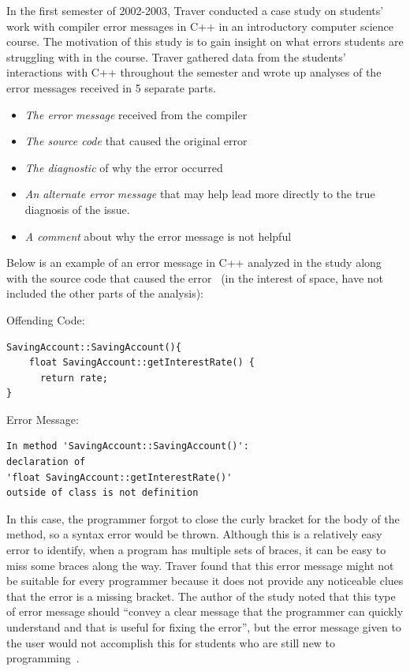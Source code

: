 \documentclass{sig-alternate}
\begin{document}
In the first semester of 2002-2003, Traver conducted a case study on students' work with compiler error messages in C++ in an introductory computer science course.
The motivation of this study is to gain insight on what errors students are struggling with in the course.
Traver gathered data from the students' interactions with C++ throughout the semester and wrote up analyses of the error messages received in 5 separate parts.
\begin{itemize}
	\item \textit{The error message} received from the compiler
	\item \textit{The source code} that caused the original error
	\item \textit{The diagnostic} of why the error occurred
	\item \textit{An alternate error message} that may help lead more directly to the true diagnosis of the issue.
	\item \textit{A comment} about why the error message is not helpful
\end{itemize}

Below is an example of an error message in C++ analyzed in the study along with the source code that caused the error~\cite{Traver:2010} (in the interest of space,  have not included the other parts of the analysis):

Offending Code:
\begin{verbatim}
SavingAccount::SavingAccount(){
    float SavingAccount::getInterestRate() {
   	  return rate;
}
\end{verbatim}

Error Message:
\begin{verbatim}
In method 'SavingAccount::SavingAccount()':
declaration of 
'float SavingAccount::getInterestRate()'
outside of class is not definition
\end{verbatim}

In this case, the programmer forgot to close the curly bracket for the body of the method, so a syntax error would be thrown.
Although this is a relatively easy error to identify, when a program has multiple sets of braces, it can be easy to miss some braces along the way.
Traver found that this error message might not be suitable for every programmer because it does not provide any noticeable clues that the error is a missing bracket.
The author of the study noted that this type of error message should ``convey a clear message that the programmer can quickly understand and that is useful for fixing the error'', but the error message given to the user would not accomplish this for students who are still new to programming~\cite{Traver:2010}.
\end{document}
